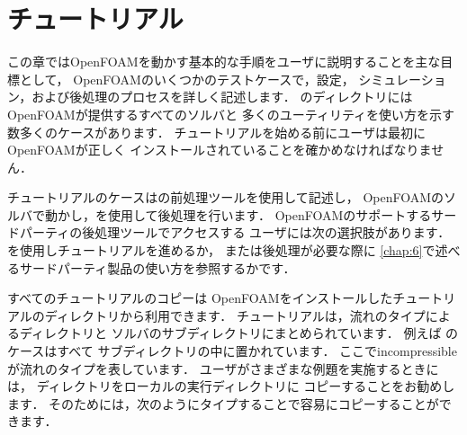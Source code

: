 \chapter{チュートリアル}
\label{chap:2}
この章ではOpenFOAMを動かす基本的な手順をユーザに説明することを主な目標として，
OpenFOAMのいくつかのテストケースで，設定，
シミュレーション，および後処理のプロセスを詳しく記述します．
のディレクトリには
OpenFOAMが提供するすべてのソルバと
多くのユーティリティを使い方を示す数多くのケースがあります．
チュートリアルを始める前にユーザは最初にOpenFOAMが正しく
インストールされていることを確かめなければなりません．

チュートリアルのケースはの前処理ツールを使用して記述し，
OpenFOAMのソルバで動かし，を使用して後処理を行います．
OpenFOAMのサポートするサードパーティの後処理ツールでアクセスする
ユーザには次の選択肢があります．
を使用しチュートリアルを進めるか，
または後処理が必要な際に
\autoref{chap:6}で述べるサードパーティ製品の使い方を参照するかです．

すべてのチュートリアルのコピーは
OpenFOAMをインストールしたチュートリアルのディレクトリから利用できます．
チュートリアルは，流れのタイプによるディレクトリと
ソルバのサブディレクトリにまとめられています．
例えば
%
%
のケースはすべて
サブディレクトリの中に置かれています．
ここでincompressibleが流れのタイプを表しています．
ユーザがさまざまな例題を実施するときには，
%
%
ディレクトリをローカルの実行ディレクトリに
コピーすることをお勧めします．
そのためには，次のようにタイプすることで容易にコピーすることができます．



